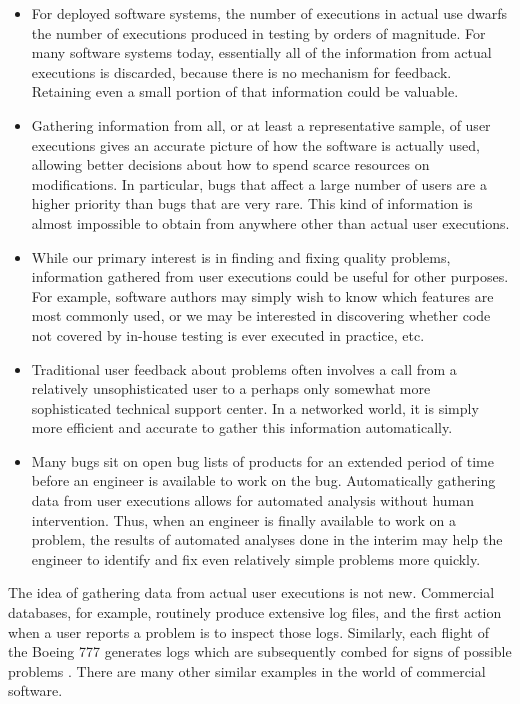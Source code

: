 \begin{itemize}
  
\item For deployed software systems, the number of executions in
  actual use dwarfs the number of executions produced in testing by
  orders of magnitude.  For many software systems today, essentially
  all of the information from actual executions is discarded, because
  there is no mechanism for feedback.  Retaining even a small portion
  of that information could be valuable.
  
\item Gathering information from all, or at least a representative
  sample, of user executions gives an accurate picture of how the
  software is actually used, allowing better decisions about how to
  spend scarce resources on modifications. In particular, bugs that
  affect a large number of users are a higher priority than bugs that
  are very rare.  This kind of information is almost impossible to
  obtain from anywhere other than actual user executions.
  
\item While our primary interest is in finding and fixing quality
  problems, information gathered from user executions could be useful
  for other purposes.  For example, software authors may simply wish
  to know which features are most commonly used, or we may be
  interested in discovering whether code not covered by in-house
  testing is ever executed in practice, etc.
  
\item Traditional user feedback about problems often involves a call
  from a relatively unsophisticated user to a perhaps only somewhat
  more sophisticated technical support center.  In a networked world,
  it is simply more efficient and accurate to gather this information
  automatically.
  
\item Many bugs sit on open bug lists of products for an extended
  period of time before an engineer is available to work on the bug.
  Automatically gathering data from user executions allows for
  automated analysis without human intervention.  Thus, when an
  engineer is finally available to work on a problem, the results of
  automated analyses done in the interim may help the engineer to
  identify and fix even relatively simple problems more quickly.
\end{itemize}

The idea of gathering data from actual user executions is not new.
Commercial databases, for example, routinely produce extensive log
files, and the first action when a user reports a problem is to
inspect those logs.  Similarly, each flight of the Boeing 777
generates logs which are subsequently combed for signs of possible
problems \cite{Esler:2001:WVR}.  There are many other similar examples
in the world of commercial software.

